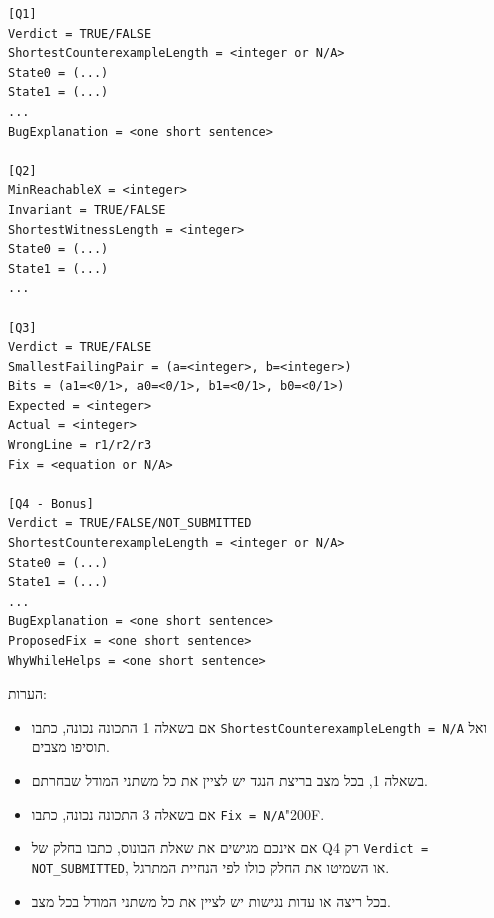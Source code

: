 \documentclass[11pt,a4paper]{article}
\newcommand{\RLM}{\char"200F}
\newenvironment{englishlisting}
  {\begin{english}\begin{flushleft}}
  {\end{flushleft}\end{english}}
\begin{document}
\begin{englishlisting}
\begin{lstlisting}
[Q1]
Verdict = TRUE/FALSE
ShortestCounterexampleLength = <integer or N/A>
State0 = (...)
State1 = (...)
...
BugExplanation = <one short sentence>

[Q2]
MinReachableX = <integer>
Invariant = TRUE/FALSE
ShortestWitnessLength = <integer>
State0 = (...)
State1 = (...)
...

[Q3]
Verdict = TRUE/FALSE
SmallestFailingPair = (a=<integer>, b=<integer>)
Bits = (a1=<0/1>, a0=<0/1>, b1=<0/1>, b0=<0/1>)
Expected = <integer>
Actual = <integer>
WrongLine = r1/r2/r3
Fix = <equation or N/A>

[Q4 - Bonus]
Verdict = TRUE/FALSE/NOT_SUBMITTED
ShortestCounterexampleLength = <integer or N/A>
State0 = (...)
State1 = (...)
...
BugExplanation = <one short sentence>
ProposedFix = <one short sentence>
WhyWhileHelps = <one short sentence>
\end{lstlisting}
\end{englishlisting}

\noindent
הערות:
\begin{itemize}
  \item אם בשאלה 1 התכונה נכונה, כתבו \texttt{ShortestCounterexampleLength = N/A} ואל תוסיפו מצבים.
  \item בשאלה 1, בכל מצב בריצת הנגד יש לציין את כל משתני המודל שבחרתם.
  \item אם בשאלה 3 התכונה נכונה, כתבו \texttt{Fix = N/A}\RLM.
  \item אם אינכם מגישים את שאלת הבונוס, כתבו בחלק של \textenglish{Q4} רק \texttt{Verdict = NOT\_SUBMITTED}, או השמיטו את החלק כולו לפי הנחיית המתרגל.
  \item בכל ריצה או עדות נגישות יש לציין את כל משתני המודל בכל מצב.
\end{itemize}
\end{document}
